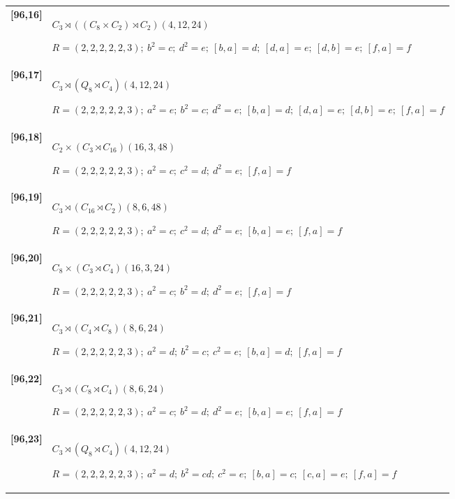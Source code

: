 \documentclass[UTF8,fontset=fandol,11pt,a4paper]{ctexart}
\begin{document}
\begin{longtable}{@{}p{17mm}>{\raggedright\arraybackslash}p{141mm}@{}}
\textbf{[96,16]} & $C_{3}\rtimes ((C_{8}\times C_{2})\rtimes C_{2})$\quad $(4,12,24)$\par\(R=(2,2,2,2,2,3);\allowbreak\ b^{2}=c;\allowbreak\ d^{2}=e;\allowbreak\ [b,a]=d;\allowbreak\ [d,a]=e;\allowbreak\ [d,b]=e;\allowbreak\ [f,a]=f\)\\[3pt]

\textbf{[96,17]} & $C_{3}\rtimes (Q_{8}\rtimes C_{4})$\quad $(4,12,24)$\par\(R=(2,2,2,2,2,3);\allowbreak\ a^{2}=e;\allowbreak\ b^{2}=c;\allowbreak\ d^{2}=e;\allowbreak\ [b,a]=d;\allowbreak\ [d,a]=e;\allowbreak\ [d,b]=e;\allowbreak\ [f,a]=f\)\\[3pt]

\textbf{[96,18]} & $C_{2}\times (C_{3}\rtimes C_{16})$\quad $(16,3,48)$\par\(R=(2,2,2,2,2,3);\allowbreak\ a^{2}=c;\allowbreak\ c^{2}=d;\allowbreak\ d^{2}=e;\allowbreak\ [f,a]=f\)\\[3pt]

\textbf{[96,19]} & $C_{3}\rtimes (C_{16}\rtimes C_{2})$\quad $(8,6,48)$\par\(R=(2,2,2,2,2,3);\allowbreak\ a^{2}=c;\allowbreak\ c^{2}=d;\allowbreak\ d^{2}=e;\allowbreak\ [b,a]=e;\allowbreak\ [f,a]=f\)\\[3pt]

\textbf{[96,20]} & $C_{8}\times (C_{3}\rtimes C_{4})$\quad $(16,3,24)$\par\(R=(2,2,2,2,2,3);\allowbreak\ a^{2}=c;\allowbreak\ b^{2}=d;\allowbreak\ d^{2}=e;\allowbreak\ [f,a]=f\)\\[3pt]

\textbf{[96,21]} & $C_{3}\rtimes (C_{4}\rtimes C_{8})$\quad $(8,6,24)$\par\(R=(2,2,2,2,2,3);\allowbreak\ a^{2}=d;\allowbreak\ b^{2}=c;\allowbreak\ c^{2}=e;\allowbreak\ [b,a]=d;\allowbreak\ [f,a]=f\)\\[3pt]

\textbf{[96,22]} & $C_{3}\rtimes (C_{8}\rtimes C_{4})$\quad $(8,6,24)$\par\(R=(2,2,2,2,2,3);\allowbreak\ a^{2}=c;\allowbreak\ b^{2}=d;\allowbreak\ d^{2}=e;\allowbreak\ [b,a]=e;\allowbreak\ [f,a]=f\)\\[3pt]

\textbf{[96,23]} & $C_{3}\rtimes (Q_{8}\rtimes C_{4})$\quad $(4,12,24)$\par\(R=(2,2,2,2,2,3);\allowbreak\ a^{2}=d;\allowbreak\ b^{2}=cd;\allowbreak\ c^{2}=e;\allowbreak\ [b,a]=c;\allowbreak\ [c,a]=e;\allowbreak\ [f,a]=f\)\\[3pt]


\end{longtable}
\end{document}
